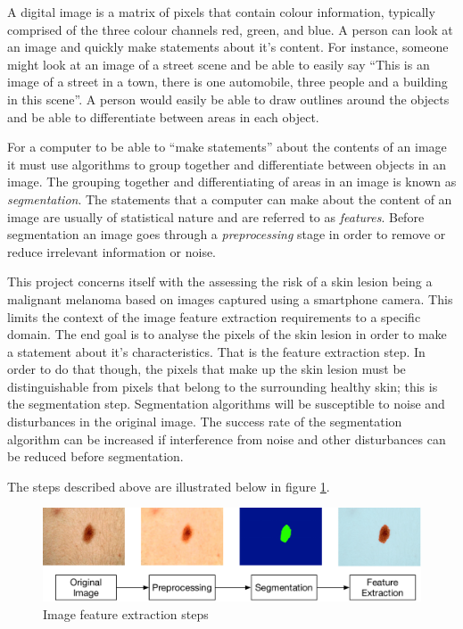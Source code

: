 A digital image is a matrix of pixels that contain colour information, typically comprised of the three colour channels red, green, and blue. A person can look at an image and quickly make statements about it’s content. For instance, someone might look at an image of a street scene and be able to easily say “This is an image of a street in a town, there is one automobile, three people and a building in this scene”. A person would easily be able to draw outlines around the objects and be able to differentiate between areas in each object.

For a computer to be able to “make statements” about the contents of an image it must use algorithms to group together and differentiate between objects in an image. The grouping together and differentiating of areas in an image is known as \textit{segmentation}. The statements that a computer can make about the content of an image are usually of statistical nature and are referred to as \textit{features}. Before segmentation an image goes through a \textit{preprocessing} stage in order to remove or reduce irrelevant information or noise.

This project concerns itself with the assessing the risk of a skin lesion being a malignant melanoma based on images captured using a smartphone camera. This limits the context of the image feature extraction requirements to a specific domain. The end goal is to analyse the pixels of the skin lesion in order to make a statement about it’s characteristics. That is the feature extraction step. In order to do that though, the pixels that make up the skin lesion must be distinguishable from pixels that belong to the surrounding healthy skin; this is the segmentation step. Segmentation algorithms will be susceptible to noise and disturbances in the original image. The success rate of the segmentation algorithm can be increased if interference from noise and other disturbances can be reduced before segmentation.

The steps described above are illustrated below in figure \ref{fig:steps}.

\begin{figure}[H]
    \includegraphics[width=\textwidth,keepaspectratio]{assets/image_processing/steps.pdf}
    \caption{Image feature extraction steps}
    \label{fig:steps}
\end{figure}



% 

